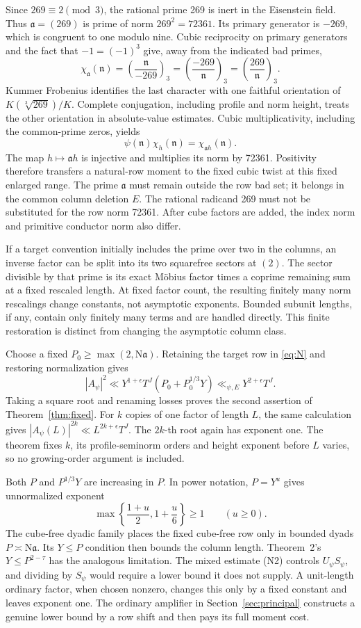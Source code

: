 \documentclass[11pt]{article}
\theoremstyle{remark}\newtheorem{remark}[theorem]{Remark}
\newcommand{\N}{\mathrm N}
\begin{document}
Since $269\equiv2\pmod3$, the rational prime 269 is inert in the Eisenstein field. Thus $\mathfrak a=(269)$ is prime of norm $269^2=72361$. Its primary generator is $-269$, which is congruent to one modulo nine. Cubic reciprocity on primary generators and the fact that $-1=(-1)^3$ give, away from the indicated bad primes,
\[
\chi_{\mathfrak a}(\mathfrak n)
=\left(\frac{\mathfrak n}{-269}\right)_3
=\left(\frac{-269}{\mathfrak n}\right)_3
=\left(\frac{269}{\mathfrak n}\right)_3.
\]
Kummer Frobenius identifies the last character with one faithful orientation of $K(\sqrt[3]{269})/K$. Complete conjugation, including profile and norm height, treats the other orientation in absolute-value estimates. Cubic multiplicativity, including the common-prime zeros, yields
\[
\psi(\mathfrak n)\chi_h(\mathfrak n)=\chi_{\mathfrak a h}(\mathfrak n).
\]
The map $h\mapsto\mathfrak a h$ is injective and multiplies its norm by 72361. Positivity therefore transfers a natural-row moment to the fixed cubic twist at this fixed enlarged range. The prime $\mathfrak a$ must remain outside the row bad set; it belongs in the common column deletion $E$. The rational radicand 269 must not be substituted for the row norm 72361. After cube factors are added, the index norm and primitive conductor norm also differ.

If a target convention initially includes the prime over two in the columns, an inverse factor can be split into its two squarefree sectors at $(2)$. The sector divisible by that prime is its exact Möbius factor times a coprime remaining sum at a fixed rescaled length. At fixed factor count, the resulting finitely many norm rescalings change constants, not asymptotic exponents. Bounded subunit lengths, if any, contain only finitely many terms and are handled directly. This finite restoration is distinct from changing the asymptotic column class.

Choose a fixed $P_0\ge\max(2,\N\mathfrak a)$. Retaining the target row in \eqref{eq:N} and restoring normalization gives
\[
|A_\psi|^2\ll
Y^{1+\epsilon}T^J(P_0+P_0^{1/3}Y)
\ll_{\psi,E}Y^{2+\epsilon}T^J.
\]
Taking a square root and renaming losses proves the second assertion of Theorem~\ref{thm:fixed}. For $k$ copies of one factor of length $L$, the same calculation gives $|A_\psi(L)|^{2k}\ll L^{2k+\epsilon}T^J$. The $2k$-th root again has exponent one. The theorem fixes $k$, its profile-seminorm orders and height exponent before $L$ varies, so no growing-order argument is included.

Both $P$ and $P^{1/3}Y$ are increasing in $P$. In power notation, $P=Y^u$ gives unnormalized exponent
\[
\max\left\{\frac{1+u}{2},1+\frac u6\right\}\ge1
\qquad(u\ge0).
\]
The cube-free dyadic family places the fixed cube-free row only in bounded dyads $P\asymp\N\mathfrak a$. Its $Y\le P$ condition then bounds the column length. Theorem~2's $Y\le P^{2-\tau}$ has the analogous limitation. The mixed estimate (N2) controls $U_\psi S_\psi$, and dividing by $S_\psi$ would require a lower bound it does not supply. A unit-length ordinary factor, when chosen nonzero, changes this only by a fixed constant and leaves exponent one. The ordinary amplifier in Section~\ref{sec:principal} constructs a genuine lower bound by a row shift and then pays its full moment cost.
\end{document}
